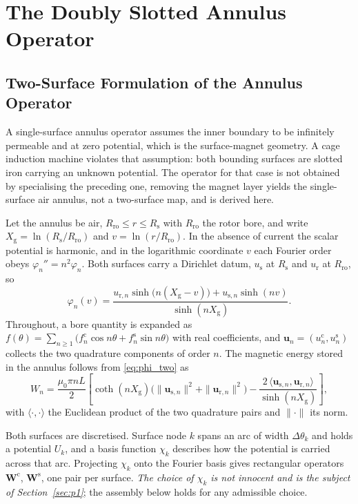 \documentclass[10pt,a4paper,twocolumn]{article}
\newcommand{\Rs}{R_{\mathrm{s}}}
\newcommand{\Rro}{R_{\mathrm{ro}}}
\newcommand{\Xg}{X_{\mathrm{g}}}
\theoremstyle{plain}
\theoremstyle{remark}
\begin{document}

\section{The Doubly Slotted Annulus Operator}
\label{sec:twosurface}

\subsection{Two-Surface Formulation of the Annulus Operator}
\label{sub:twosurface}

A single-surface annulus operator assumes the inner boundary to be
infinitely permeable and at zero potential, which is the surface-magnet
geometry. A cage induction machine violates that assumption: both
bounding surfaces are slotted iron carrying an unknown potential. The
operator for that case is not obtained by specialising the preceding
one, removing the magnet layer yields the single-surface air annulus,
not a two-surface map, and is derived here.

Let the annulus be air, $\Rro \le r \le \Rs$ with $\Rro$ the rotor bore,
and write $\Xg=\ln(\Rs/\Rro)$ and $v=\ln(r/\Rro)$. In the absence of
current the scalar potential is harmonic, and in the logarithmic
coordinate $v$ each Fourier order obeys
$\varphi_n''=n^2\varphi_n$. Both surfaces carry a Dirichlet datum,
$u_{\mathrm{s}}$ at $\Rs$ and $u_{\mathrm{r}}$ at $\Rro$, so
\begin{equation}
\varphi_n(v)=\frac{u_{\mathrm{r},n}\sinh\!\big(n(\Xg-v)\big)
+u_{\mathrm{s},n}\sinh(nv)}{\sinh(n\Xg)} .
\label{eq:phi_two}
\end{equation}
Throughout, a bore quantity is expanded as
$f(\theta)=\sum_{n\ge1}\big(f^{\mathrm{c}}_n\cos n\theta
+f^{\mathrm{s}}_n\sin n\theta\big)$ with real coefficients, and
$\bm{u}_n=(u^{\mathrm{c}}_n,u^{\mathrm{s}}_n)$ collects the two
quadrature components of order $n$. The magnetic energy stored in the
annulus follows from \eqref{eq:phi_two} as
\begin{equation}
W_n=\frac{\mu_0\pi n L}{2}\left[
\coth(n\Xg)\Big(\|\bm{u}_{\mathrm{s},n}\|^2+\|\bm{u}_{\mathrm{r},n}\|^2\Big)
-\frac{2\,\langle\bm{u}_{\mathrm{s},n},\bm{u}_{\mathrm{r},n}\rangle}
{\sinh(n\Xg)}\right],
\label{eq:W_two}
\end{equation}
with $\langle\cdot,\cdot\rangle$ the Euclidean product of the two
quadrature pairs and $\|\cdot\|$ its norm.

Both surfaces are discretised. Surface node $k$ spans an arc of width
$\Delta\theta_k$ and holds a potential $U_k$, and a basis function
$\chi_k$ describes how the potential is carried across that arc.
Projecting $\chi_k$ onto the Fourier basis gives rectangular operators
$\bm{W}^{\mathrm{c}}$, $\bm{W}^{\mathrm{s}}$, one pair per surface.
\emph{The choice of $\chi_k$ is not innocent and is the subject of
Section~\ref{sec:p1}}; the assembly below holds for any admissible
choice.
\end{document}
